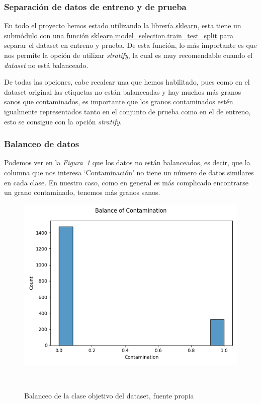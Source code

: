 \subsubsection{Separación de datos de entreno y de prueba}

En todo el proyecto hemos estado utilizando la librería \href{https://scikit-learn.org/stable/}{sklearn}, esta tiene un submódulo con una función \href{https://scikit-learn.org/stable/modules/generated/sklearn.model_selection.train_test_split.html}{sklearn.model\_selection.train\_test\_split} para separar el \gls{dataset} en entreno y prueba. De esta función, lo más importante es que nos permite la opción de utilizar \textit{stratify}, la cual es muy recomendable cuando el \textit{dataset} no está balanceado.

De todas las opciones, cabe recalcar una que hemos habilitado, pues como en el \gls{dataset} original las etiquetas no están balanceadas y hay muchos más granos sanos que contaminados, es importante que los granos contaminados estén igualmente representados tanto en el conjunto de prueba como en el de entreno, esto se consigue con la opción \textit{stratify}.


\subsubsection{Balanceo de datos}

Podemos ver en la \textit{Figura\ \ref{fig:unbalance}} que los datos no están balanceados, es decir, que la columna que nos interesa `Contaminación' no tiene un número de datos similares en cada clase. En nuestro caso, como en general es más complicado encontrarse un grano contaminado, tenemos más granos sanos.

\begin{figure}[!h]
    \centering
    \includegraphics[width=0.5\linewidth]{media/images/unabalance.png}
    \caption{Balanceo de la clase objetivo del \gls{dataset}, fuente propia}\ \label{fig:unbalance}
\end{figure}

